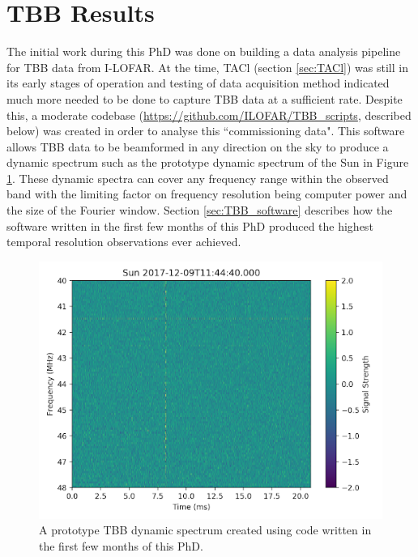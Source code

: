 
\section{TBB Results}
\label{sec:tbb_results}
The initial work during this PhD was done on building a data analysis pipeline for TBB data from I-LOFAR. At the time, TACl (section \ref{sec:TACl}) was still in its early stages of operation and testing of data acquisition method indicated much more needed to be done to capture TBB data at a sufficient rate. Despite this, a moderate codebase (\url{https://github.com/ILOFAR/TBB_scripts}, described below) was created in order to analyse this ``commissioning data". This software allows TBB data to be beamformed in any direction on the sky to produce a dynamic spectrum such as the prototype dynamic spectrum of the Sun in Figure \ref{fig:proto_dspec}. These dynamic spectra can cover any frequency range within the observed band with the limiting factor on frequency resolution being computer power and the size of the Fourier window. Section \ref{sec:TBB_software} describes how the software written in the first few months of this PhD produced the highest temporal resolution observations ever achieved.
\begin{figure}
    \centering
    \includegraphics[width=0.5\columnwidth]{Images/TBB_dspec.png}
    \caption[Prototype TBB dynamic spectrum]{A prototype TBB dynamic spectrum created using code written in the first few months of this PhD.}
    \label{fig:proto_dspec}
\end{figure}


